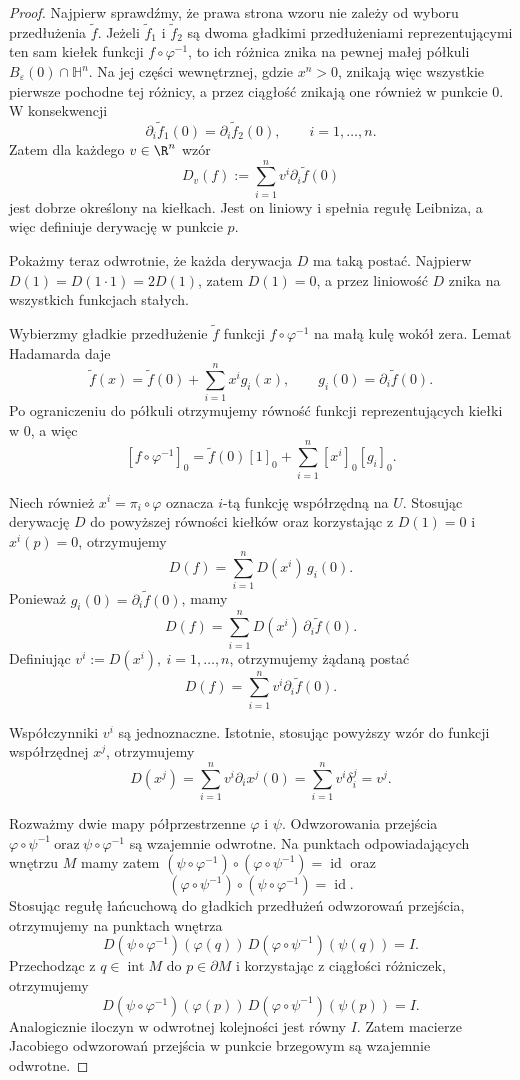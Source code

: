 \begin{proof}
Najpierw sprawdźmy, że prawa strona wzoru nie zależy od wyboru
przedłużenia $\widetilde f$. Jeżeli $\widetilde f_1$ i
$\widetilde f_2$ są dwoma gładkimi przedłużeniami reprezentującymi
ten sam kiełek funkcji $f\circ\varphi^{-1}$, to ich różnica znika
na pewnej małej półkuli $B_\varepsilon(0)\cap\mathbb H^n$.
Na jej części wewnętrznej, gdzie $x^n>0$, znikają więc wszystkie
pierwsze pochodne tej różnicy, a przez ciągłość znikają one również
w punkcie $0$. W konsekwencji
\[
\partial_i\widetilde f_1(0)
=
\partial_i\widetilde f_2(0),
\qquad i=1,\ldots,n.
\]
Zatem dla każdego $v\in\R^n$ wzór
\[
D_v(f):=\sum_{i=1}^n v^i\partial_i\widetilde f(0)
\]
jest dobrze określony na kiełkach. Jest on liniowy i spełnia regułę
Leibniza, a więc definiuje derywację w punkcie $p$.

Pokażmy teraz odwrotnie, że każda derywacja $D$ ma taką postać.
Najpierw $D(1)=D(1\cdot1)=2D(1)$,
zatem $D(1)=0$, a przez liniowość $D$ znika na wszystkich funkcjach
stałych.

Wybierzmy gładkie przedłużenie $\widetilde f$ funkcji
$f\circ\varphi^{-1}$ na małą kulę wokół zera. Lemat Hadamarda daje
\[
\widetilde f(x)
=
\widetilde f(0)+\sum_{i=1}^n x^i g_i(x),
\qquad
g_i(0)=\partial_i\widetilde f(0).
\]
Po ograniczeniu do półkuli otrzymujemy równość funkcji
reprezentujących kiełki w $0$, a więc
\[
[f\circ\varphi^{-1}]_0
=
\widetilde f(0)[1]_0
+
\sum_{i=1}^n [x^i]_0[g_i]_0.
\]

Niech również $x^i=\pi_i\circ\varphi$ oznacza $i$-tą funkcję
współrzędną na $U$. Stosując derywację $D$ do powyższej równości
kiełków oraz korzystając z $D(1)=0$ i $x^i(p)=0$, otrzymujemy
\[
D(f)
=
\sum_{i=1}^n D(x^i)\,g_i(0).
\]
Ponieważ $g_i(0)=\partial_i\widetilde f(0)$,
mamy
\[
D(f)
=
\sum_{i=1}^n D(x^i)\,\partial_i\widetilde f(0).
\]
Definiując $v^i:=D(x^i), \ i=1,\ldots,n$,
otrzymujemy żądaną postać
\[
D(f)
=
\sum_{i=1}^n v^i\partial_i\widetilde f(0).
\]

Współczynniki $v^i$ są jednoznaczne. Istotnie, stosując powyższy
wzór do funkcji współrzędnej $x^j$, otrzymujemy
\[
D(x^j)
=
\sum_{i=1}^n v^i\partial_i x^j(0)
=
\sum_{i=1}^n v^i\delta_i^j
=
v^j.
\]

Rozważmy dwie mapy półprzestrzenne $\varphi$ i $\psi$.
Odwzorowania przejścia $\varphi\circ\psi^{-1} \ \text{oraz}\ \psi\circ\varphi^{-1}$
są wzajemnie odwrotne. Na punktach odpowiadających wnętrzu $M$ mamy zatem
$(\psi\circ\varphi^{-1})\circ(\varphi\circ\psi^{-1}) =\operatorname{id}$
oraz
\[
(\varphi\circ\psi^{-1})\circ(\psi\circ\varphi^{-1})
=\operatorname{id}.
\]
Stosując regułę łańcuchową do gładkich przedłużeń odwzorowań
przejścia, otrzymujemy na punktach wnętrza
\[
D(\psi\circ\varphi^{-1})(\varphi(q))\,
D(\varphi\circ\psi^{-1})(\psi(q))
=I.
\]
Przechodząc z $q\in\operatorname{int}M$ do $p\in\partial M$
i korzystając z ciągłości różniczek, otrzymujemy
\[
D(\psi\circ\varphi^{-1})(\varphi(p))\,
D(\varphi\circ\psi^{-1})(\psi(p))
=I.
\]
Analogicznie iloczyn w odwrotnej kolejności jest równy $I$.
Zatem macierze Jacobiego odwzorowań przejścia w punkcie brzegowym
są wzajemnie odwrotne.


\end{proof}

